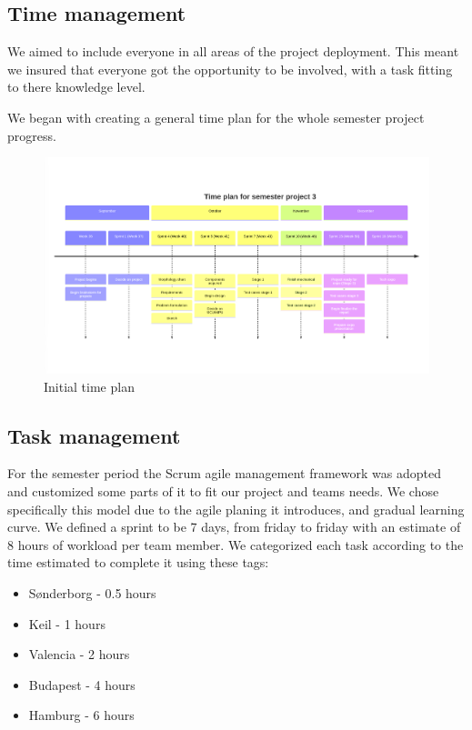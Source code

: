 \documentclass[../report.tex]{subfiles}
\begin{document}
\subsection{Time management}
We aimed to include everyone in all areas of the project deployment. This meant
we insured that everyone got the opportunity to be involved, with a task
fitting to there knowledge level.

We began with creating a general time plan for the whole semester project
progress.
\begin{figure}[H]
    \includegraphics[width=\textwidth]{Management/timeplan.png}
    \caption{Initial time plan}
\end{figure}

\subsection{Task management}

For the semester period the Scrum agile management framework was adopted and customized some parts of it to fit our project
and teams needs. We chose specifically this model due to the agile planing it introduces, and gradual
learning curve. We defined a sprint to be 7 days, from friday to friday with an estimate of 8 hours of
workload per team member. We categorized each task according to the time estimated to complete it
using these tags:

\begin{itemize}
    \item Sønderborg - 0.5 hours
    \item Keil - 1 hours
    \item Valencia - 2 hours
    \item Budapest - 4 hours
    \item Hamburg -  6 hours
\end{itemize}
\end{document}
